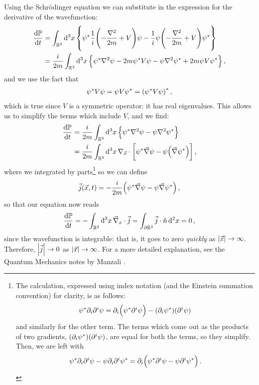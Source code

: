 \documentclass[main.tex]{subfiles}
\begin{document}
Using the Schrödinger equation we can substitute in the expression for the derivative of the wavefunction: 
%
\begin{align}
\dv{\mathbb{P}}{t} &= \int_{\mathbb{R}^3} \dd[3]{x} \qty{
\psi^{*}  \frac{1}{i}\qty(-\frac{\nabla^2}{2m}+V) \psi - \frac{1}{i} \psi \qty(- \frac{\nabla^2}{2m} + V) \psi^{*}   
}  \\
&= \frac{i}{2m} \int_{\mathbb{R}^3} \dd[3]{x} \qty{
\psi^{*} \nabla^2 \psi - 2m \psi^{*} V \psi 
- \psi \nabla^2 \psi^{*}
+ 2m \psi V \psi^{*}
}
\,,
\end{align}
%
and we use the fact that 
%
\begin{align}
\psi^{*} V \psi  = \psi V \psi^{*} = \qty(\psi^{*} V \psi )^{*}
\,,
\end{align}
%
which is true since \(V\) is a symmetric operator: it has real eigenvalues. This allows us to simplify the terms which include \(V\), and we find:
%
\begin{align}
\dv{\mathbb{P}}{t} &= \frac{i}{2m} \int_{\mathbb{R}^3 } \dd[3]{x} \qty{
\psi^{*} \nabla^2 \psi 
- \psi \nabla^2 \psi^{*}  
}  \\
&= \frac{i}{2m} \int_{\mathbb{R}^3} \dd[3]{x}
\nabla_{\vec{x}} \cdot \qty[
\psi^{*} \vec{\nabla} \psi - \psi\qty(\vec{\nabla} \psi^{*})]
\,,
\end{align}
%
where we integrated by parts\footnote{The calculation, expressed using index notation (and the Einstein summation convention) for clarity, is as follows: 
%
\begin{align}
\psi^{*} \partial_{i} \partial^{i} \psi  = \partial_{i} \qty(\psi^{*} \partial^{i} \psi)  - (\partial_{i} \psi^{*})(\partial^{i} \psi)
\,
\end{align}
%
and similarly for the other term. The terms which come out as the products of two gradients, \(\qty(\partial_{i} \psi^{*}) (\partial^{i} \psi)\), are equal for both the terms, so they simplify. Then, we are left with 
%
\begin{align}
\psi^{*} \partial_{i} \partial^{i} \psi - \psi \partial_{i} \partial^{i} \psi^{*} = \partial_{i} \qty(\psi^{*} \partial^{i} \psi - \psi \partial^{i} \psi^{*})
\,.
\end{align}
%
} so we can define 
%
\begin{align}
\vec{j} (\vec{x}, t) = - \frac{i}{2m} \qty(\psi^{*} \vec{\nabla} \psi - \psi \vec{\nabla} \psi^{*}  )
\,,
\end{align}
%
so that our equation now reads 
%
\begin{align}
\dv{\mathbb{P}}{t} = - \int_{\mathbb{R}^3} \dd[3]{x} \vec{\nabla}_{x} \cdot \vec{j} 
= \int_{\partial \mathbb{R}^3} \vec{j} \cdot \hat{n} \dd[2]{x} = 0
\,,
\end{align}
%
since the wavefunction is integrable: that is, it goes to zero \emph{quickly} as \(\abs{\vec{x}} \rightarrow \infty \). 
Therefore, \(\abs{\vec{j}} \rightarrow 0\) as \(\abs{\vec{x}} \rightarrow \infty \). For a more detailed explanation, see the Quantum Mechanics notes by Manzali \cite[page 147]{manzaliAppuntiDiFisica2019}.
\end{document}
